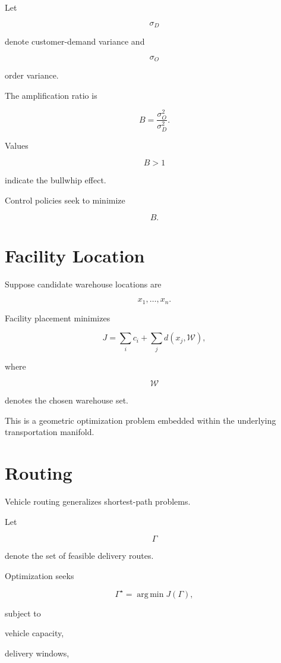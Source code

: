 \documentclass[11pt,fleqn]{book}
\numberwithin{equation}{chapter}
\theoremstyle{plain}
\theoremstyle{definition}
\theoremstyle{remark}
\begin{document}
Let

\[
\sigma_D
\]

denote customer-demand variance and

\[
\sigma_O
\]

order variance.

The amplification ratio is

\[
B
=
\frac{\sigma_O^2}
{\sigma_D^2}.
\]

Values

\[
B>1
\]

indicate the bullwhip effect.

Control policies seek to minimize

\[
B.
\]


\section{Facility Location}

Suppose candidate warehouse locations are

\[
x_1,\ldots,x_n.
\]

Facility placement minimizes

\[
\boxed{
J
=
\sum_i
c_i
+
\sum_j
d(x_j,\mathcal W),
}
\]

where

\[
\mathcal W
\]

denotes the chosen warehouse set.

This is a geometric optimization problem embedded within the underlying
transportation manifold.


\section{Routing}

Vehicle routing generalizes shortest-path problems.

Let

\[
\Gamma
\]

denote the set of feasible delivery routes.

Optimization seeks

\[
\Gamma^\star
=
\operatorname*{arg\,min}
J(\Gamma),
\]

subject to

vehicle capacity,

delivery windows,
\end{document}
